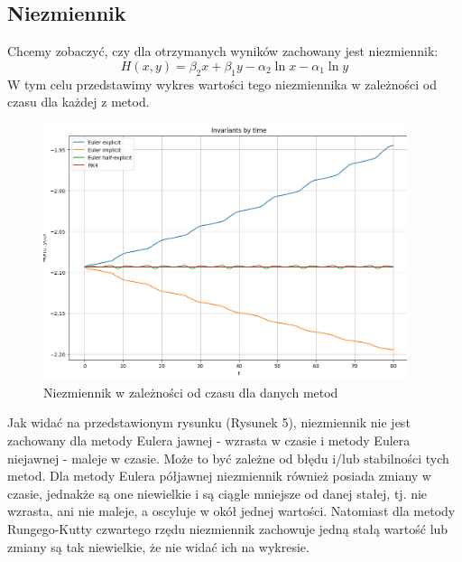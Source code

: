 \documentclass{article}
\begin{document}
\subsection{Niezmiennik}
Chcemy zobaczyć, czy dla otrzymanych wyników zachowany jest niezmiennik:
$$H(x,y) = \beta_2x + \beta_1y - \alpha_2\ln x - \alpha_1\ln y$$
W tym celu przedstawimy wykres wartości tego niezmiennika w zależności od czasu dla każdej z metod.
\begin{figure}[H]
    \centering
    \includegraphics[width=0.95\textwidth]{4}
    \caption{Niezmiennik w zależności od czasu dla danych metod}
    \label{fig:mesh}
\end{figure}
Jak widać na przedstawionym rysunku (Rysunek 5), niezmiennik nie jest zachowany dla metody Eulera jawnej - wzrasta w czasie i metody Eulera niejawnej - maleje w czasie. Może to być zależne od błędu i/lub stabilności tych metod. Dla metody Eulera półjawnej niezmiennik również posiada zmiany w czasie, jednakże są one niewielkie i są ciągle mniejsze od danej stałej, tj. nie wzrasta, ani nie maleje, a oscyluje w okół jednej wartości. Natomiast dla metody Rungego-Kutty czwartego rzędu niezmiennik zachowuje jedną stałą wartość lub zmiany są tak niewielkie, że nie widać ich na wykresie.
\end{document}
